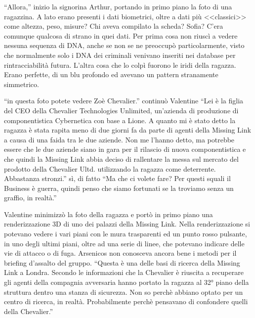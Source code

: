     ``Allora,'' inizio la signorina Arthur, portando in primo piano la foto di una ragazzina. A lato erano presenti i
    dati biometrici, oltre a dati più <<classici>> come altezza, peso, misure? Chi aveva compilato la scheda? Sofia?
    C'era comunque qualcosa di strano in quei dati. Per prima cosa non riuscì a vedere nessuna sequenza di DNA, anche se
    non se ne preoccupò particolarmente, visto che normalmente solo i DNA dei criminali venivano inseriti nei database
    per rintracciabilità futura. L'altra cosa che lo colpì fuorono le iridi della ragazza. Erano perfette, di un blu
    profondo ed avevano un pattern stranamente simmetrico.
    
    ``in questa foto potete vedere Zoè Chevalier.'' continuò Valentine ``Lei è la figlia del CEO della Chevalier
    Technologies Unlimited, un'azienda di produzione di componentistica Cybernetica con base a Lione. A quanto mi è
    stato detto la ragazza è stata rapita meno di due giorni fa da parte di agenti della Missing Link a causa di una
    faida tra le due aziende. Non me l'hanno detto, ma potrebbe essere che le due aziende siano in gara per il rilascio
    di nuova componentistica e che quindi la Missing Link abbia deciso di rallentare la messa sul mercato del prodotto
    della Chevalier Ultd. utilizzando la ragazza come deterrente. Abbastanza stronzi.'' sì, di fatto ``Ma che ci volete
    fare? Per questi squali il Business è guerra, quindi penso che siamo fortunati se la troviamo senza un graffio, in
    realtà.'' 

    Valentine minimizzò la foto della ragazza e portò in primo piano una renderizzazione 3D di uno dei palazzi della
    Missing Link. Nella renderizzazione si potevano vedere i vari piani con le mura trasparenti ed un punto rosso
    pulsante, in uno degli ultimi piani, oltre ad una serie di linee, che potevano indicare delle vie di attacco o di
    fuga. Arsenicos non conosceva ancora bene i metodi per il briefing d'assalto del gruppo. ``Questa è una delle basi
    di ricerca della Missing Link a Londra. Secondo le informazioni che la Chevalier è riuscita a recuperare gli agenti
    della compagnia avversaria hanno portato la ragazza al 32° piano della struttura dentro una stanza di sicurezza. Non
    so perchè abbiano optato per un centro di ricerca, in realtà. Probabilmente perchè pensavano di confondere quelli
    della Chevalier.''

